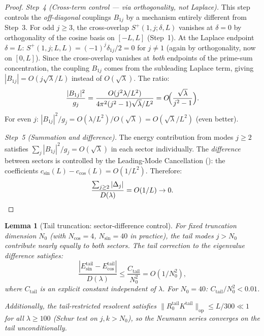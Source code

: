 \documentclass[12pt,a4paper]{article}
\newtheorem{lemma}[theorem]{Lemma}
\theoremstyle{definition}
\theoremstyle{remark}
\begin{document}
\begin{proof}
\emph{Step~4 (Cross-term control --- via orthogonality, not Laplace).} This step controls the \emph{off-diagonal} couplings $B_{1j}$ by a mechanism entirely different from Step~3. For odd $j \geq 3$, the cross-overlap $S^+(1,j;\delta,L)$ vanishes at $\delta = 0$ by orthogonality of the cosine basis on $[-L,L]$ (Step~1). At the Laplace endpoint $\delta = L$: $S^+(1,j;L,L) = (-1)^j\delta_{1j}/2 = 0$ for $j \neq 1$ (again by orthogonality, now on $[0,L]$). Since the cross-overlap vanishes at \emph{both} endpoints of the prime-sum concentration, the coupling $B_{1j}$ comes from the subleading Laplace term, giving $|B_{1j}| = O(j\sqrt{\lambda}/L)$ instead of $O(\sqrt{\lambda})$. The ratio:
\[
  \frac{|B_{1j}|^2}{g_j} = \frac{O(j^2\lambda/L^2)}{4\pi^2(j^2-1)\sqrt{\lambda}/L^2} = O\!\Bigl(\frac{\sqrt{\lambda}}{j^2-1}\Bigr).
\]
For even $j$: $|B_{1j}|^2/g_j = O(\lambda/L^2)/O(\sqrt{\lambda}) = O(\sqrt{\lambda}/L^2)$ (even better).

\emph{Step~5 (Summation and difference).} The energy contribution from modes $j \geq 2$ satisfies $\sum_j |B_{1j}|^2/g_j = O(\sqrt{\lambda})$ in each sector individually. The \emph{difference} between sectors is controlled by the Leading-Mode Cancellation (): the coefficients $c_{\sin}(L) - c_{\cos}(L) = O(1/L^2)$. Therefore:
\[
  \frac{\sum_{j \geq 2}|\Delta_j|}{D(\lambda)} = O(1/L) \to 0. \qedhere
\]
\end{proof}

\begin{lemma}[Tail truncation: sector-difference control]
\label{lem:resolvent-truncation}
For fixed truncation dimension $N_0$ (with $N_{\cos} = 4$, $N_{\sin} = 40$ in practice), the tail modes $j > N_0$ contribute nearly equally to both sectors. The tail correction to the eigenvalue \emph{difference} satisfies:
\begin{equation}
\label{eq:tail-diff}
  \frac{|E_{\sin}^{\mathrm{tail}} - E_{\cos}^{\mathrm{tail}}|}{D(\lambda)}
  \leq \frac{C_{\mathrm{tail}}}{N_0^2} = O(1/N_0^2),
\end{equation}
where $C_{\mathrm{tail}}$ is an explicit constant independent of $\lambda$. For $N_0 = 40$: $C_{\mathrm{tail}}/N_0^2 < 0.01$.

Additionally, the tail-restricted resolvent satisfies $\|R_0^{\mathrm{tail}} K^{\mathrm{tail}}\|_{\mathrm{op}} \leq L/300 \ll 1$ for all $\lambda \geq 100$ (Schur test on $j, k > N_0$), so the Neumann series converges on the tail unconditionally.
\end{lemma}
\end{document}
